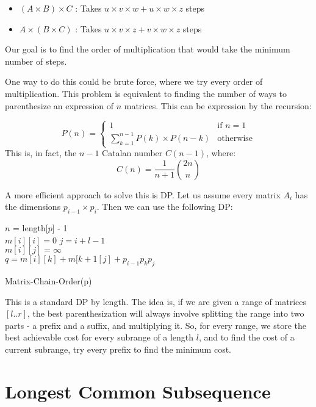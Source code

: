 \documentclass[12pt,letterpaper]{article}
\theoremstyle{definition}
\begin{document}
\begin{itemize}
  \item $(A \times B) \times C$ : Takes $u \times v \times w + u \times w \times z$ steps
  \item $A \times (B \times C)$ : Takes $u \times v \times z + v \times w \times z$ steps
\end{itemize}

Our goal is to find the order of multiplication that would take the minimum number of steps.

One way to do this could be brute force, where we try every order of multiplication. This problem is equivalent to finding the number of ways to parenthesize an expression of $n$ matrices. This can be expression by the recursion:

\[P(n) = \begin{cases}
1 & \text{if } n = 1 \\
\sum_{k=1}^{n-1} P(k) \times P(n-k) & \text{otherwise}
\end{cases}
\]
This is, in fact, the $n-1$ Catalan number $C(n-1)$, where:
\[C(n) = \frac{1}{n+1} {2n \choose n}\]

A more efficient approach to solve this is DP. Let us assume every matrix $A_i$ has the dimensions $p_{i-1} \times p_i$. Then we can use the following DP:

\begin{algorithm}[H]
  \SetAlgoLined
  $n$ = length[$p$] - 1 \\
   {
    $m[i][i] = 0$
  }
   {
     {
      $j=i+l-1$ \\
      $m[i][j] = \infty$ \\
       {
        $q = m[i][k] + m[k+1[j] + p_{i-1}p_kp_j$ \\
      }
    }
  }
  \caption{Matrix-Chain-Order(p)}
\end{algorithm}

This is a standard DP by length. The idea is, if we are given a range of matrices $[l .. r]$, the best parenthesization will always involve splitting the range into two parts - a prefix and a suffix, and multiplying it. So, for every range, we store the best achievable cost for every subrange of a length $l$, and to find the cost of a current subrange, try every prefix to find the minimum cost.

\section{Longest Common Subsequence}
\end{document}
